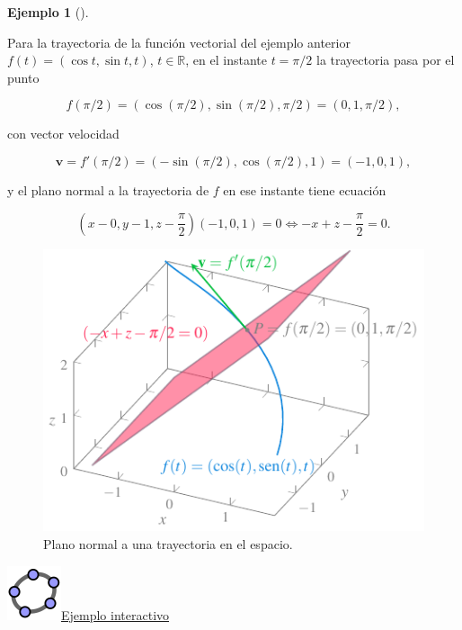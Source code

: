 \documentclass[
  a4paper,
]{scrreport}
\theoremstyle{definition}
\newtheorem{example}{Ejemplo}[chapter]
\theoremstyle{plain}
\theoremstyle{plain}
\theoremstyle{plain}
\theoremstyle{definition}
\theoremstyle{remark}
\begin{document}
\begin{example}[]\protect\hypertarget{exm-plano-normal-trayectoria-espacio}{}\label{exm-plano-normal-trayectoria-espacio}

Para la trayectoria de la función vectorial del ejemplo anterior
\(f(t)=(\cos t, \sin t, t)\), \(t\in \mathbb{R}\), en el instante
\(t=\pi/2\) la trayectoria pasa por el punto

\[
f(\pi/2)=(\cos(\pi/2),\sin(\pi/2),\pi/2)=(0,1,\pi/2),
\]

con vector velocidad

\[
\mathbf{v}=f'(\pi/2)=(-\sin(\pi/2),\cos(\pi/2), 1)=(-1,0,1),
\]

y el plano normal a la trayectoria de \(f\) en ese instante tiene
ecuación

\[
\left(x-0,y-1,z-\frac{\pi}{2}\right)(-1,0,1) =0 \Leftrightarrow -x+z-\frac{\pi}{2}=0.
\]

\begin{figure}

{\centering \includegraphics{img/derivadas-funciones-vectoriales/plano-normal-trayectoria-espacio.pdf}

}

\caption{Plano normal a una trayectoria en el espacio.}

\end{figure}

\href{https://www.geogebra.org/m/Q2C7EfBn}{\includegraphics{img/logos/logo-geogebra.png}Ejemplo
interactivo}

\end{example}
\end{document}
